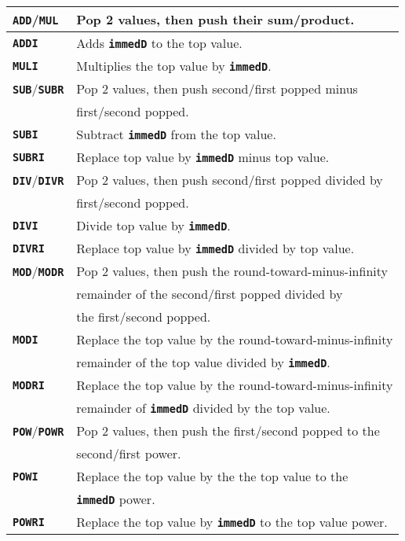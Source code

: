 \documentclass[12pt]{article}
\makeatletter
\newcommand{\TT}[1]{{\tt \bfseries #1}}
\newcommand{\ttkey}[1]{\TT{#1}\index{#1@{\tt #1}}}
\newlength{\figurewidth}
\newenvironment{boxedfigure}[1][!btp]%
	{\begin{figure*}[#1]
	 \begin{lrbox}{\figurebox}
	 \begin{minipage}{\figurewidth}

	 \vspace*{1ex}}%
	{
	 \vspace*{1ex}

	 \end{minipage}
	 \end{lrbox}

	 \centering
	 \fbox{\hspace*{0.1in}\usebox{\figurebox}\hspace*{0.1in}}
	 \end{figure*}}
\makeatother
\begin{document}
\begin{boxedfigure}[p!]

\begin{center}
\begin{tabular}{|l|l|}
\hline
\ttkey{ADD}/\ttkey{MUL}
    & Pop 2 values, then push their sum/product.
\\\hline
\ttkey{ADDI}
    & Adds \TT{immedD} to the top value.
\\\hline
\ttkey{MULI}
    & Multiplies the top value by \TT{immedD}.
\\\hline
\ttkey{SUB}/\ttkey{SUBR}
    & Pop 2 values, then push second/first popped minus \\
    & first/second popped.
\\\hline
\ttkey{SUBI}
    & Subtract \TT{immedD} from the top value.
\\\hline
\ttkey{SUBRI}
    & Replace top value by \TT{immedD} minus top value.
\\\hline
\ttkey{DIV}/\ttkey{DIVR}
    & Pop 2 values, then push second/first popped divided by\\
    & first/second popped.
\\\hline
\ttkey{DIVI}
    & Divide top value by \TT{immedD}.
\\\hline
\ttkey{DIVRI}
    & Replace top value by \TT{immedD} divided by top value.
\\\hline
\ttkey{MOD}/\ttkey{MODR}
    & Pop 2 values, then push the round-toward-minus-infinity \\
    & remainder of the second/first popped divided by \\
    & the first/second popped.
\\\hline
\ttkey{MODI}
    & Replace the top value by the round-toward-minus-infinity \\
    & remainder of the top value divided by \TT{immedD}.
\\\hline
\ttkey{MODRI}
    & Replace the top value by the round-toward-minus-infinity \\
    & remainder of \TT{immedD} divided by the top value.
\\\hline
\ttkey{POW}/\ttkey{POWR}
    & Pop 2 values, then push the first/second popped to the \\
    & second/first power.
\\\hline
\ttkey{POWI}
    & Replace the top value by the the top value to the \\
    & \TT{immedD} power.
\\\hline
\ttkey{POWRI}
    & Replace the top value by \TT{immedD} to the top value power.

\end{tabular}
\end{center}
\end{boxedfigure}
\end{document}
